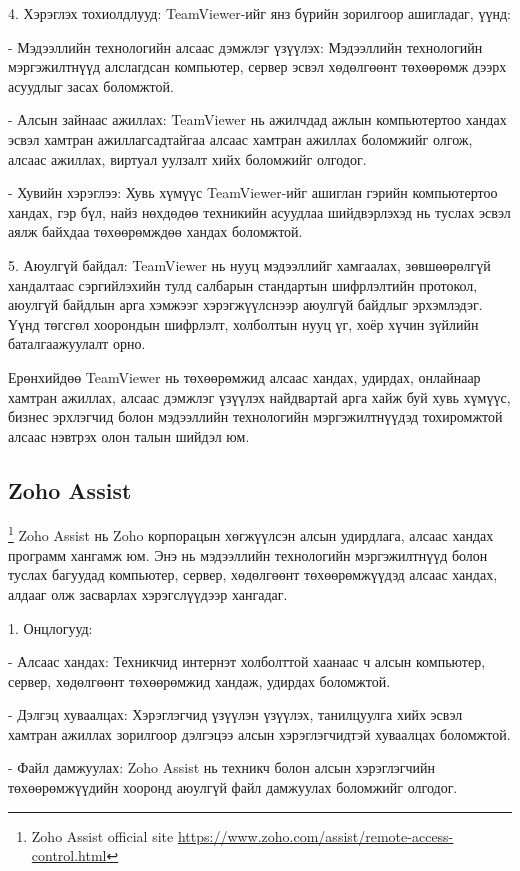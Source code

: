 4. Хэрэглэх тохиолдлууд: TeamViewer-ийг янз бүрийн зорилгоор ашигладаг, үүнд:

- Мэдээллийн технологийн алсаас дэмжлэг үзүүлэх: Мэдээллийн технологийн мэргэжилтнүүд алслагдсан компьютер, сервер эсвэл хөдөлгөөнт төхөөрөмж дээрх асуудлыг засах боломжтой.

- Алсын зайнаас ажиллах: TeamViewer нь ажилчдад ажлын компьютертоо хандах эсвэл хамтран ажиллагсадтайгаа алсаас хамтран ажиллах боломжийг олгож, алсаас ажиллах, виртуал уулзалт хийх боломжийг олгодог.

- Хувийн хэрэглээ: Хувь хүмүүс TeamViewer-ийг ашиглан гэрийн компьютертоо хандах, гэр бүл, найз нөхдөдөө техникийн асуудлаа шийдвэрлэхэд нь туслах эсвэл аялж байхдаа төхөөрөмждөө хандах боломжтой.

5. Аюулгүй байдал: TeamViewer нь нууц мэдээллийг хамгаалах, зөвшөөрөлгүй хандалтаас сэргийлэхийн тулд салбарын стандартын шифрлэлтийн протокол, аюулгүй байдлын арга хэмжээг хэрэгжүүлснээр аюулгүй байдлыг эрхэмлэдэг. Үүнд төгсгөл хоорондын шифрлэлт, холболтын нууц үг, хоёр хүчин зүйлийн баталгаажуулалт орно.

Ерөнхийдөө TeamViewer нь төхөөрөмжид алсаас хандах, удирдах, онлайнаар хамтран ажиллах, алсаас дэмжлэг үзүүлэх найдвартай арга хайж буй хувь хүмүүс, бизнес эрхлэгчид болон мэдээллийн технологийн мэргэжилтнүүдэд тохиромжтой алсаас нэвтрэх олон талын шийдэл юм.
			
\pagebreak

\subsection{Zoho Assist}
\footnote{Zoho Assist official site \url{https://www.zoho.com/assist/remote-access-control.html}}
	\quad \quad Zoho Assist нь Zoho корпорацын хөгжүүлсэн алсын удирдлага, алсаас хандах программ хангамж юм. Энэ нь мэдээллийн технологийн мэргэжилтнүүд болон туслах багуудад компьютер, сервер, хөдөлгөөнт төхөөрөмжүүдэд алсаас хандах, алдааг олж засварлах хэрэгслүүдээр хангадаг.

1. Онцлогууд: 

- Алсаас хандах: Техникчид интернэт холболттой хаанаас ч алсын компьютер, сервер, хөдөлгөөнт төхөөрөмжид хандаж, удирдах боломжтой.

- Дэлгэц хуваалцах: Хэрэглэгчид үзүүлэн үзүүлэх, танилцуулга хийх эсвэл хамтран ажиллах зорилгоор дэлгэцээ алсын хэрэглэгчидтэй хуваалцах боломжтой.

- Файл дамжуулах: Zoho Assist нь техникч болон алсын хэрэглэгчийн төхөөрөмжүүдийн хооронд аюулгүй файл дамжуулах боломжийг олгодог.

